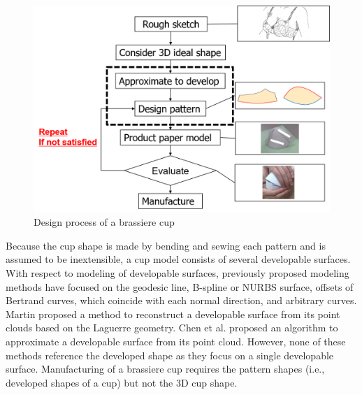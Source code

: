 \documentclass[E]{scitrans}
\begin{document}
\begin{figure}[h!]
	\centering
	\includegraphics[width= 1.0 \columnwidth]{./figure/DesignProcess3.png}
	\caption{Design process of a brassiere cup}
	\label{fig:process}
\end{figure}

Because the cup shape is made by bending and sewing each pattern and is assumed to be inextensible, a cup model consists of several developable surfaces. With respect to modeling of developable surfaces, previously proposed modeling methods have focused on the geodesic line\cite{c2}, B-spline or NURBS surface\cite{c3,c4}, offsets of Bertrand curves, which coincide with each normal direction\cite{c5,c6}, and arbitrary curves\cite{c7}. Martin proposed a method to reconstruct a developable surface from its point clouds based on the Laguerre geometry\cite{c8}. Chen et al. proposed an algorithm to approximate a developable surface from its point cloud\cite{c9}. However, none of these methods reference the developed shape as they focus on a single developable surface. Manufacturing of a brassiere cup requires the pattern shapes (i.e., developed shapes of a cup) but not the 3D cup shape.
\end{document}
